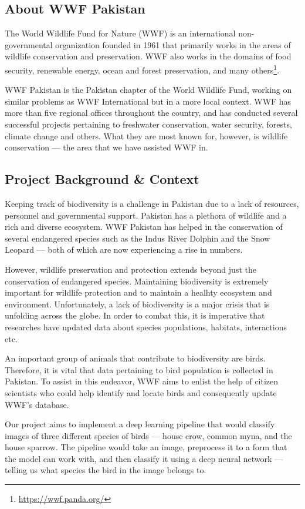 \documentclass{article}
\begin{document}
\subsection{About WWF Pakistan}
The World Wildlife Fund for Nature (WWF) is an international non-governmental organization
founded in 1961 that primarily works in the areas of wildlife conservation and preservation.
WWF also works in the domains of food security, renewable energy, ocean and forest preservation, 
and many others\footnote{\url{https://wwf.panda.org/}}.

WWF Pakistan is the Pakistan chapter of the World Wildlife Fund, working on similar problems as 
WWF International but in a more local context. WWF has more than five regional offices 
throughout the country, and has conducted several successful 
projects pertaining to freshwater conservation, water security, forests, climate change and others.
What they are most known for, however, is wildlife conservation --- the area that we 
have assisted WWF in.

\subsection{Project Background \& Context}
Keeping track of biodiversity is a challenge in Pakistan due to a lack of resources, personnel 
and governmental support. Pakistan has a plethora of wildlife and a rich and diverse ecosystem. 
WWF Pakistan has helped in the conservation of several endangered species such as the 
Indus River Dolphin and the Snow Leopard --- both of which are now experiencing a rise in numbers. 

However, wildlife preservation and protection extends beyond just the conservation of 
endangered species. Maintaining biodiversity is extremely important for 
wildlife protection and to maintain a healhty ecosystem and environment. Unfortunately, 
a lack of biodiversity is a major crisis that is unfolding across the globe. In order to 
combat this, it is imperative that researches have updated data about species populations, 
habitats, interactions etc. 

An important group of animals that contribute to biodiversity are birds. Therefore, 
it is vital that data pertaining to bird population is collected in Pakistan. 
To assist in this endeavor, WWF aims to enlist the help of citizen scientists who could 
help identify and locate birds and consequently update WWF's database. 

Our project aims to implement a deep learning pipeline that would 
classify images of three different species of birds --- house crow, common 
myna, and the house sparrow. The pipeline would take an image, preprocess it 
to a form that the model can work with, and then classify it using a deep 
neural network --- telling us what species the bird in the image belongs to. 
\end{document}
